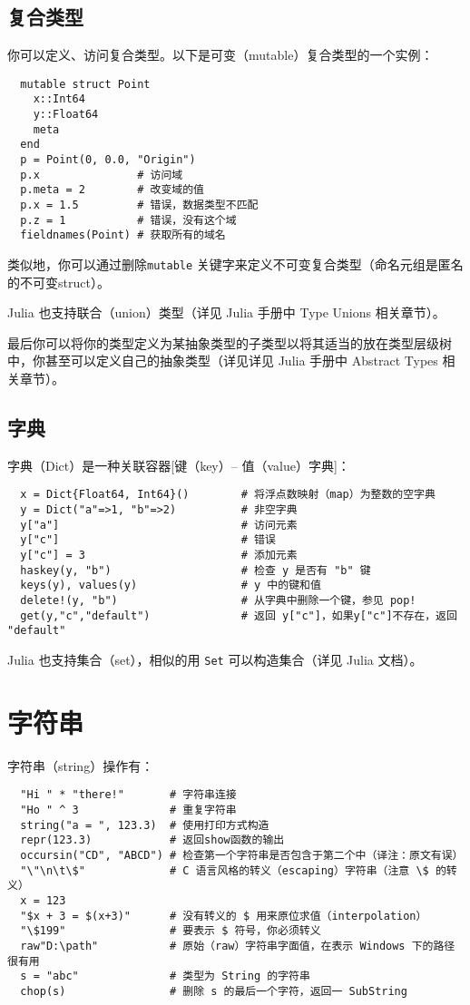 \documentclass[10pt,a4paper]{article}
\begin{document}
\subsection{复合类型}
你可以定义、访问复合类型。以下是可变（mutable）复合类型的一个实例：
\begin{lstlisting}
  mutable struct Point
    x::Int64
    y::Float64
    meta
  end
  p = Point(0, 0.0, "Origin")
  p.x               # 访问域
  p.meta = 2        # 改变域的值
  p.x = 1.5         # 错误，数据类型不匹配
  p.z = 1           # 错误，没有这个域
  fieldnames(Point) # 获取所有的域名
\end{lstlisting}

类似地，你可以通过删除\lstinline|mutable| 关键字来定义不可变复合类型（命名元组是匿名的不可变struct）。 

Julia 也支持联合（union）类型（详见 Julia 手册中 Type Unions 相关章节）。

最后你可以将你的类型定义为某抽象类型的子类型以将其适当的放在类型层级树中，你甚至可以定义自己的抽象类型（详见详见 Julia 手册中 Abstract Types 相关章节）。

\subsection{字典}
字典（Dict）是一种关联容器[键（key）-- 值（value）字典]：
\begin{lstlisting}
  x = Dict{Float64, Int64}()        # 将浮点数映射（map）为整数的空字典
  y = Dict("a"=>1, "b"=>2)          # 非空字典
  y["a"]                            # 访问元素
  y["c"]                            # 错误
  y["c"] = 3                        # 添加元素
  haskey(y, "b")                    # 检查 y 是否有 "b" 键
  keys(y), values(y)                # y 中的键和值
  delete!(y, "b")                   # 从字典中删除一个键，参见 pop!
  get(y,"c","default")              # 返回 y["c"]，如果y["c"]不存在，返回 "default"
\end{lstlisting}
Julia 也支持集合（set），相似的用 \lstinline|Set| 可以构造集合（详见 Julia 文档）。

\section{字符串}
字符串（string）操作有：
\begin{lstlisting}
  "Hi " * "there!"       # 字符串连接
  "Ho " ^ 3              # 重复字符串
  string("a = ", 123.3)  # 使用打印方式构造
  repr(123.3)            # 返回show函数的输出
  occursin("CD", "ABCD") # 检查第一个字符串是否包含于第二个中（译注：原文有误）
  "\"\n\t\$"             # C 语言风格的转义（escaping）字符串（注意 \$ 的转义）
  x = 123
  "$x + 3 = $(x+3)"      # 没有转义的 $ 用来原位求值（interpolation）
  "\$199"                # 要表示 $ 符号，你必须转义
  raw"D:\path"           # 原始（raw）字符串字面值，在表示 Windows 下的路径很有用
  s = "abc"              # 类型为 String 的字符串
  chop(s)                # 删除 s 的最后一个字符，返回一 SubString
\end{lstlisting}
\end{document}
